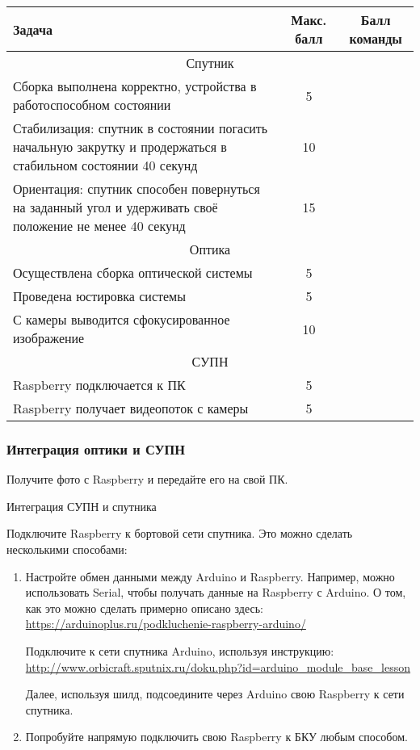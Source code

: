\begin{table}[H]
    \center
    \begin{tabular}{|p{10cm}|c|c|}
        \hline
        Задача	&Макс. балл	&Балл команды \\
        \hline
        \multicolumn{3}{|c|}{Спутник} \\
        \hline
        Сборка выполнена корректно, устройства в работоспособном состоянии	&5	& \\
        \hline
        Стабилизация: спутник в состоянии погасить начальную закрутку и продержаться в стабильном состоянии 40 секунд	&10&\\
        \hline
        Ориентация: спутник способен повернуться на заданный угол и удерживать своё положение не менее 40 секунд&	15&\\
        \hline
        \multicolumn{3}{|c|}{Оптика} \\
        \hline
        Осуществлена сборка оптической системы&	5&\\
        \hline
        Проведена юстировка системы	&5&	\\
        \hline
        С камеры выводится сфокусированное изображение&	10&\\
        \hline
        \multicolumn{3}{|c|}{СУПН} \\
        \hline
        Raspberry подключается к ПК	&5	&\\
        \hline
        Raspberry получает видеопоток с камеры	&5	&\\
        \hline
    \end{tabular}
\end{table}

\subsubsection*{Интеграция оптики и СУПН}

Получите фото с Raspberry и передайте его на свой ПК.

Интеграция СУПН и спутника

Подключите Raspberry к бортовой сети спутника. Это можно сделать несколькими способами:
\begin{enumerate}
    \item Настройте обмен данными между Arduino и Raspberry. Например, можно использовать Serial, чтобы получать данные на Raspberry с Arduino. О том, как это можно сделать примерно описано здесь: \url{https://arduinoplus.ru/podkluchenie-raspberry-arduino/}
    
    Подключите к сети спутника Arduino, используя инструкцию: \url{http://www.orbicraft.sputnix.ru/doku.php?id=arduino_module_base_lesson}

    Далее, используя шилд, подсоедините через Arduino свою Raspberry к сети спутника.
    \item  Попробуйте напрямую подключить свою Raspberry к БКУ любым способом.
\end{enumerate}

